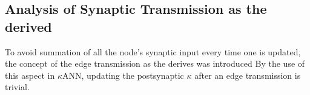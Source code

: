 











	\subsection{Analysis of Synaptic Transmission as the derived}
			\label{ssecAnalysisOfSynTransAsTheDerived}
			To avoid summation of all the node's synaptic input every time one is updated, the concept of the edge transmission as the derives was introduced
			By the use of this aspect in $\kappa$ANN, updating the postsynaptic $\kappa$ after an edge transmission is trivial.
	
